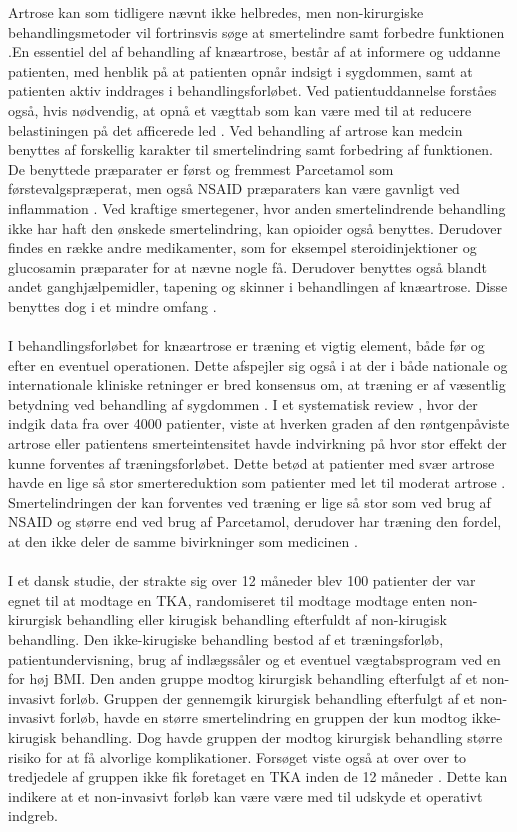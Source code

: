 Artrose kan som tidligere nævnt ikke helbredes, men non-kirurgiske behandlingsmetoder vil fortrinsvis søge at smertelindre samt forbedre funktionen \citep{brostrom2012}.En essentiel del af behandling af knæartrose, består af at informere og uddanne patienten, med henblik på at patienten opnår indsigt i sygdommen, samt at patienten aktiv inddrages i behandlingsforløbet. Ved  patientuddannelse forståes også, hvis nødvendig, at opnå et vægttab som kan være med til at reducere belastiningen på det afficerede led \citep{brostrom2012}.
Ved behandling af artrose kan medcin benyttes af forskellig karakter til smertelindring samt forbedring af funktionen. De benyttede præparater er først og fremmest Parcetamol som  førstevalgspræperat, men  også NSAID præparaters kan være gavnligt ved inflammation \citep{schroder}. Ved kraftige smertegener, hvor anden smertelindrende behandling ikke har haft den ønskede smertelindring, kan opioider også benyttes. Derudover findes en række andre medikamenter, som for eksempel steroidinjektioner og glucosamin præparater for at nævne nogle få. Derudover benyttes også blandt andet ganghjælpemidler, tapening og skinner i behandlingen af knæartrose. Disse benyttes dog i et mindre omfang \citep{brostrom2012}.\\\\

I behandlingsforløbet for knæartrose er træning et vigtig element, både før og efter en eventuel operationen. Dette afspejler sig også i at der i både nationale og internationale kliniske retninger er bred konsensus om, at træning er af væsentlig betydning ved behandling af  sygdommen  \citep{brostrom2012}.  I et systematisk review , hvor der indgik data fra over 4000 patienter, viste at hverken graden af den røntgenpåviste artrose eller patientens smerteintensitet havde indvirkning på hvor stor effekt der kunne forventes af træningsforløbet. Dette betød at patienter med svær artrose havde en lige så stor smertereduktion som patienter med let til moderat artrose \citep{Syssorenskou}. 
Smertelindringen der kan forventes ved træning er lige så stor som ved brug af NSAID og større end ved brug af Parcetamol, derudover har træning den fordel, at den ikke deler de samme bivirkninger som  medicinen \citep{sorenskou}.\\\\
I et dansk studie, der strakte sig over 12 måneder blev 100 patienter  der var egnet til at modtage en TKA, randomiseret til modtage modtage enten non-kirurgisk behandling eller kirugisk behandling efterfuldt af non-kirugisk behandling. Den ikke-kirugiske behandling  bestod af et træningsforløb, patientundervisning, brug af indlægssåler og et eventuel vægtabsprogram ved en for høj BMI. Den anden gruppe modtog kirurgisk behandling efterfulgt af et non-invasivt forløb. Gruppen der gennemgik kirurgisk behandling efterfulgt af  et non-invasivt forløb, havde en større smertelindring en gruppen der kun modtog ikke-kirugisk behandling. Dog havde gruppen der modtog kirurgisk behandling større risiko for at få alvorlige komplikationer. Forsøget viste også at over over to tredjedele af gruppen ikke fik foretaget en TKA inden de 12 måneder \citep{newEngland}. Dette kan indikere at et non-invasivt forløb kan være være med til udskyde et operativt indgreb.

